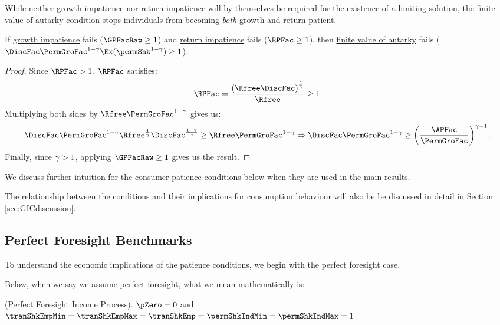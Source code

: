 \documentclass[BufferStockTheory]{subfiles}
\begin{document}
While neither growth impatience nor return impatience will by themselves be required for the existence of a limiting solution, the finite value of autarky condition stops individuals from becoming \textit{both} growth and return patient.

\begin{claim}\label{claim:noRICGIC}
If \hyperlink{GIC}{growth impatience} fails ($\GPFacRaw  \geq 1$) and \hyperlink{RIC}{return impatience} fails ($\RPFac \geq 1$), then \hyperlink{FVAC}{finite value of autarky} fails ($\DiscFac \PermGroFac^{1-\CRRA}\Ex(\permShk^{1-\CRRA})\geq 1$). 
\end{claim}

\begin{proof}
Since $\RPFac  > 1$, $\RPFac $ satisfies:
%
%
\begin{equation}
\RPFac = \frac{\left(\Rfree\DiscFac\right)^{\frac{1}{\CRRA}}}{\Rfree}\geq 1.
\end{equation}
%
Multiplying both sides by $\Rfree\PermGroFac^{1-\CRRA}$ gives us:
%
\begin{equation}
\DiscFac\PermGroFac^{1-\CRRA}\Rfree^{\frac{1}{\CRRA}}\DiscFac^{\frac{1-\CRRA}{\CRRA}}{}\geq\Rfree \PermGroFac^{1-\CRRA} \Rightarrow \DiscFac\PermGroFac^{1-\CRRA}\geq\left(\frac{\APFac}{\PermGroFac}\right)^{\CRRA-1}.
\end{equation}
%
Finally, since $\gamma>1$, applying $\GPFacRaw  \geq 1$ gives us the result.

\end{proof}

We discuss further intuition for the consumer patience conditions below when they are used in the main results.

The relationship between the conditions and their implications for consumption behaviour will also be be discussed in detail in Section \ref{sec:GICdiscussion}.

\hypertarget{Perfect-Foresight-Benchmarks}{}
\subsection{Perfect Foresight Benchmarks}\label{subsec:PFBbenchmark}
To understand the economic implications of the patience conditions, we begin with the perfect foresight case.

Below, when we say we assume perfect foresight, what we mean mathematically is:
%
\begin{assumI}\label{ass:pfincome}(Perfect Foresight Income Process).
$\pZero=0$ and $\tranShkEmpMin=\tranShkEmpMax=\bar{\tranShkEmp}=\permShkIndMin=\permShkIndMax=1$
\end{assumI}
\end{document}
